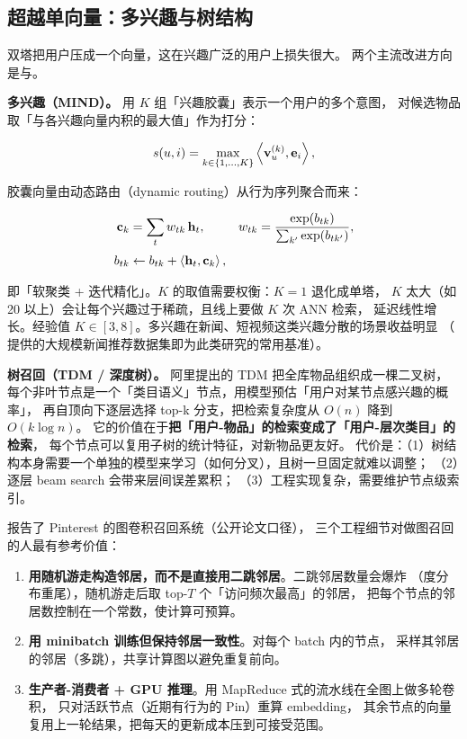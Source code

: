 \subsection{超越单向量：多兴趣与树结构}

双塔把用户压成一个向量，这在兴趣广泛的用户上损失很大。
两个主流改进方向是与。

\textbf{多兴趣（MIND）。} 用 $K$ 组「兴趣胶囊」表示一个用户的多个意图，
对候选物品取「与各兴趣向量内积的最大值」作为打分：

\begin{equation}
s(u, i) = \max_{k \in \{1,\dots,K\}} \left\langle \mathbf{v}_u^{(k)}, \mathbf{e}_i \right\rangle ,
\label{eq:mind-score}
\end{equation}

胶囊向量由动态路由（dynamic routing）从行为序列聚合而来：

\begin{align}
\mathbf{c}_k &= \sum_{t} w_{tk} \, \mathbf{h}_t, &
w_{tk} &= \frac{\exp(b_{tk})}{\sum_{k'} \exp(b_{tk'})},
\label{eq:mind-routing} \\[2pt]
b_{tk} &\leftarrow b_{tk} + \left\langle \mathbf{h}_t, \mathbf{c}_k \right\rangle, & &
\end{align}

即「软聚类 + 迭代精化」。$K$ 的取值需要权衡：$K=1$ 退化成单塔，
$K$ 太大（如 20 以上）会让每个兴趣过于稀疏，且线上要做 $K$ 次 ANN 检索，
延迟线性增长。经验值 $K \in [3, 8]$。多兴趣在新闻、短视频这类兴趣分散的场景收益明显
（\cite{chen2019mind} 提供的大规模新闻推荐数据集即为此类研究的常用基准）。

\textbf{树召回（TDM / 深度树）。} 阿里提出的 TDM 把全库物品组织成一棵二叉树，
每个非叶节点是一个「类目语义」节点，用模型预估「用户对某节点感兴趣的概率」，
再自顶向下逐层选择 top-k 分支，把检索复杂度从 $O(n)$ 降到 $O(k \log n)$。
它的价值在于\textbf{把「用户-物品」的检索变成了「用户-层次类目」的检索}，
每个节点可以复用子树的统计特征，对新物品更友好。
代价是：（1）树结构本身需要一个单独的模型来学习（如何分叉），且树一旦固定就难以调整；
（2）逐层 beam search 会带来层间误差累积；
（3）工程实现复杂，需要维护节点级索引。

\begin{casebox}
\cite{ying2018pinsage} 报告了 Pinterest 的图卷积召回系统（公开论文口径），
三个工程细节对做图召回的人最有参考价值：
\begin{enumerate}
  \item \textbf{用随机游走构造邻居，而不是直接用二跳邻居}。二跳邻居数量会爆炸
        （度分布重尾），随机游走后取 top-$T$ 个「访问频次最高」的邻居，
        把每个节点的邻居数控制在一个常数，使计算可预算。
  \item \textbf{用 minibatch 训练但保持邻居一致性}。对每个 batch 内的节点，
        采样其邻居的邻居（多跳），共享计算图以避免重复前向。
  \item \textbf{生产者-消费者 + GPU 推理}。用 MapReduce 式的流水线在全图上做多轮卷积，
        只对活跃节点（近期有行为的 Pin）重算 embedding，
        其余节点的向量复用上一轮结果，把每天的更新成本压到可接受范围。
\end{enumerate}
\end{casebox}

